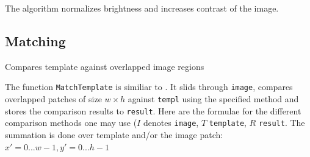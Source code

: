 The algorithm normalizes brightness and increases contrast of the image.

\subsection{Matching}

\label{MatchTemplate}

Compares template against overlapped image regions


\begin{description}
\end{description}

The function \texttt{MatchTemplate} is similiar to
. It slids through \texttt{image}, compares
overlapped patches of size $w \times h$ against \texttt{templ}
using the specified method and stores the comparison results to
\texttt{result}. Here are the formulae for the different comparison
methods one may use ($I$ denotes \texttt{image}, $T$ \texttt{template},
$R$ \texttt{result}. The summation is done over template and/or the
image patch: $x' = 0...w-1, y' = 0...h-1$


